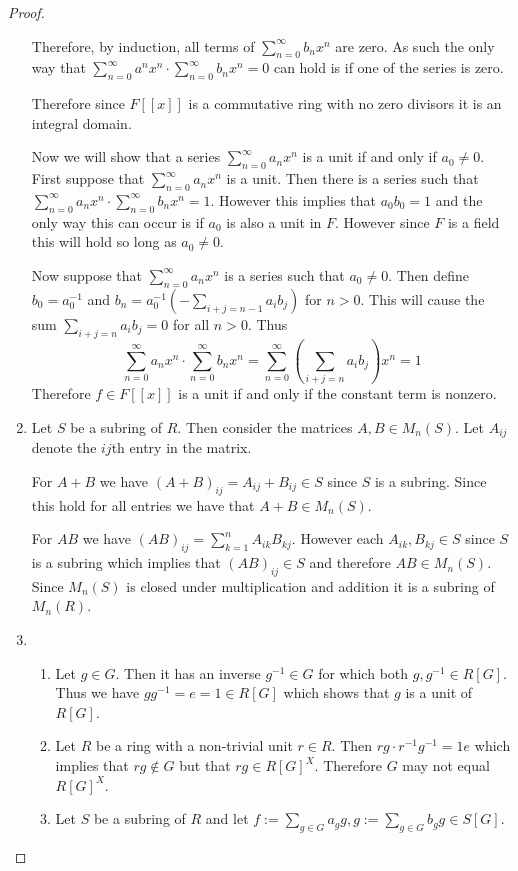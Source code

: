 \documentclass[10pt]{article}
\theoremstyle{plain}
\theoremstyle{remark}
\begin{document}
\begin{proof}
\begin{enumerate}
    Therefore, by induction, all terms of $\sum_{n=0}^\infty b_nx^n$ are zero. As such
    the only way that $\sum_{n=0}^\infty a^nx^n\cdot\sum_{n=0}^\infty b_nx^n=0$ can hold is if one of
    the series is zero.

    Therefore since $F[[x]]$ is a commutative ring with no zero divisors it is
    an integral domain.

    Now we will show that a series $\sum_{n=0}^\infty a_nx^n$ is a unit if and only if
    $a_0\neq 0$. First suppose that $\sum_{n=0}^\infty a_nx^n$ is a unit. Then there
    is a series such that $\sum_{n=0}^\infty a_nx^n\cdot\sum_{n=0}^\infty b_nx^n=1$. However this
    implies that $a_0b_0=1$ and the only way this can occur is if $a_0$ is also
    a unit in $F$. However since $F$ is a field this will hold so long as $a_0\neq 0$.

    Now suppose that $\sum_{n=0}^\infty a_nx^n$ is a series such that $a_0\neq 0$. Then define
    $b_0=a_0^{-1}$ and $b_n=a_0^{-1}(-\sum_{i+j=n-1}a_ib_j)$ for $n>0$. This will
    cause the sum $\sum_{i+j=n}a_ib_j=0$ for all $n>0$. Thus
    \[ \sum_{n=0}^\infty a_nx^n\cdot \sum_{n=0}^\infty b_nx^n=\sum_{n=0}^\infty\left(\sum_{i+j=n}a_ib_j\right)x^n =1\]
    Therefore $f\in F[[x]]$ is a unit if and only if the constant term is nonzero.
  \item Let $S$ be a subring of $R$. Then consider the matrices
    $A,B\in M_n(S)$. Let $A_{ij}$ denote the $ij$th entry in the
    matrix.
    
    For $A+B$ we have $(A+B)_{ij}=A_{ij}+B_{ij}\in S$ since $S$
    is a subring. Since this hold for all entries we have
    that $A+B\in M_n(S)$.

    For $AB$ we have $(AB)_{ij}=\sum_{k=1}^n A_{ik}B_{kj}$.
    However each $A_{ik},B_{kj}\in S$ since $S$ is a subring
    which implies that $(AB)_{ij}\in S$ and therefore $AB\in M_n(S)$.
    Since $M_n(S)$ is closed under multiplication and addition
    it is a subring of $M_n(R)$.
  \item
    \begin{enumerate}
    \item Let $g\in G$. Then it has an inverse $g^{-1}\in G$
      for which both $g,g^{-1}\in R[G]$. Thus we have
      $gg^{-1}=e=1\in R[G]$ which shows that $g$ is a unit of $R[G]$.
    \item Let $R$ be a ring with a non-trivial unit $r\in R$. Then
      $rg\cdot r^{-1}g^{-1}=1e$ which implies that $rg\notin G$ but that
      $rg\in R[G]^X$. Therefore $G$  may not equal $R[G]^X$.
    \item Let $S$ be a subring of $R$ and let $f:=\sum_{g\in G}a_gg,g:=\sum_{g\in G}b_gg\in S[G]$.


\end{enumerate}
\end{enumerate}
\end{proof}
\end{document}
